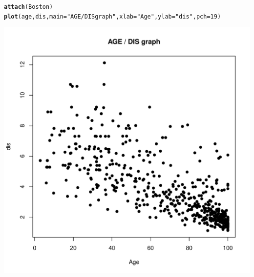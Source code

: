 \documentclass{article}\usepackage[]{graphicx}\usepackage[]{xcolor}
\makeatletter
\def\maxwidth{ %
  \ifdim\Gin@nat@width>\linewidth
    \linewidth
  \else
    \Gin@nat@width
  \fi
}
\newcommand{\hlnum}[1]{\textcolor[rgb]{0.686,0.059,0.569}{#1}}%
\newcommand{\hlsng}[1]{\textcolor[rgb]{0.192,0.494,0.8}{#1}}%
\newcommand{\hldef}[1]{\textcolor[rgb]{0.345,0.345,0.345}{#1}}%
\newcommand{\hlkwc}[1]{\textcolor[rgb]{0.333,0.667,0.333}{#1}}%
\newcommand{\hlkwd}[1]{\textcolor[rgb]{0.737,0.353,0.396}{\textbf{#1}}}%
\newenvironment{kframe}{%
 \def\at@end@of@kframe{}%
 \ifinner\ifhmode%
  \def\at@end@of@kframe{\end{minipage}}%
  \begin{minipage}{\columnwidth}%
 \fi\fi%
 \def\FrameCommand##1{\hskip\@totalleftmargin \hskip-\fboxsep
 \colorbox{shadecolor}{##1}\hskip-\fboxsep
     \hskip-\linewidth \hskip-\@totalleftmargin \hskip\columnwidth}%
 \MakeFramed {\advance\hsize-\width
   \@totalleftmargin\z@ \linewidth\hsize
   \@setminipage}}%
 {\par\unskip\endMakeFramed%
 \at@end@of@kframe}
\newenvironment{knitrout}{}{} %
\makeatother
\begin{document}
\begin{knitrout}
\begin{kframe}
\begin{alltt}
\hlkwd{attach}\hldef{(Boston)}
\hlkwd{plot}\hldef{(age, dis ,} \hlkwc{main}\hldef{=}\hlsng{"AGE / DIS graph"}\hldef{,}\hlkwc{xlab}\hldef{=}\hlsng{"Age"}\hldef{,} \hlkwc{ylab}\hldef{=}\hlsng{"dis"}\hldef{,}\hlkwc{pch}\hldef{=}\hlnum{19}\hldef{)}
\end{alltt}
\end{kframe}
\includegraphics[width=\maxwidth]{figure/unnamed-chunk-2-2} 
\end{knitrout}
\end{document}
